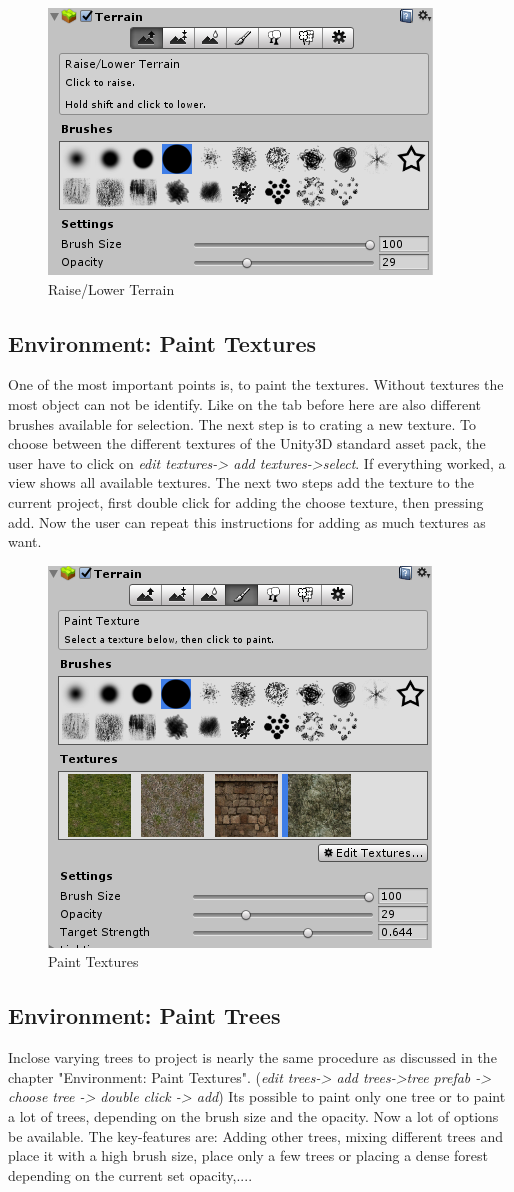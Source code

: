 \documentclass[conference]{IEEEtran}
\begin{document}
\begin{figure}[htbp]
  \includegraphics[width=.4\textwidth]{pictures/raise_lower_terrain}
  \caption{Raise/Lower Terrain}
  \label{fig:raise_lower_terrain}
\end{figure}

\subsection{Environment: Paint Textures}
One of the most important points is, to paint the textures. Without textures the most object can not be identify. 
Like on the tab before here are also different brushes available for selection. The next step is to crating a new texture. 
To choose between the different textures of the Unity3D standard asset pack, the user have to click on \emph{edit textures-> add textures->select}. If everything worked, a view shows all available textures. The next two steps add the texture to the current project, first double click for adding the choose texture, then pressing add. Now the user can repeat this instructions for adding as much textures as want.

\begin{figure}[htbp]
  \includegraphics[width=.4\textwidth]{pictures/paint_textures}
  \caption{Paint Textures}
  \label{fig:paint_textures}
\end{figure}

\subsection{Environment: Paint Trees}
Inclose varying trees to project is nearly the same procedure as discussed in the chapter "Environment: Paint Textures". (\emph{edit trees-> add trees->tree prefab -> choose tree -> double click -> add})
Its possible to paint only one tree or to paint a lot of trees, depending on the brush size and the opacity. Now a lot of options be available. The key-features are: Adding other trees, mixing different trees and place it with a high brush size, place only a few trees or placing a dense forest depending on the current set opacity,....
\end{document}
